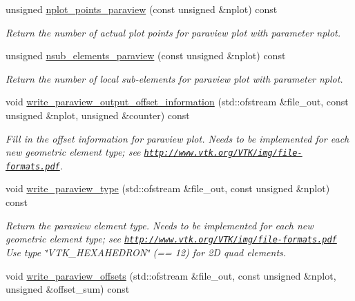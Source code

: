 \begin{DoxyCompactItemize}
unsigned \hyperlink{classoomph_1_1QElement_3_013_00_01NNODE__1D_01_4_a53c3d7fccadcf9ccb31ffb189204b969}{nplot\+\_\+points\+\_\+paraview} (const unsigned \&nplot) const
\begin{DoxyCompactList}\small\item\em Return the number of actual plot points for paraview plot with parameter nplot. \end{DoxyCompactList}\item 
unsigned \hyperlink{classoomph_1_1QElement_3_013_00_01NNODE__1D_01_4_ae10dea50eb35b969ebd996d21aa34c6b}{nsub\+\_\+elements\+\_\+paraview} (const unsigned \&nplot) const
\begin{DoxyCompactList}\small\item\em Return the number of local sub-\/elements for paraview plot with parameter nplot. \end{DoxyCompactList}\item 
void \hyperlink{classoomph_1_1QElement_3_013_00_01NNODE__1D_01_4_af7668b4257246d397fc5302bed22c5b5}{write\+\_\+paraview\+\_\+output\+\_\+offset\+\_\+information} (std\+::ofstream \&file\+\_\+out, const unsigned \&nplot, unsigned \&counter) const
\begin{DoxyCompactList}\small\item\em Fill in the offset information for paraview plot. Needs to be implemented for each new geometric element type; see \href{http://www.vtk.org/VTK/img/file-formats.pdf}{\tt http\+://www.\+vtk.\+org/\+V\+T\+K/img/file-\/formats.\+pdf}. \end{DoxyCompactList}\item 
void \hyperlink{classoomph_1_1QElement_3_013_00_01NNODE__1D_01_4_ad7a02e0ff26ec1a2e757c54ba993cfb7}{write\+\_\+paraview\+\_\+type} (std\+::ofstream \&file\+\_\+out, const unsigned \&nplot) const
\begin{DoxyCompactList}\small\item\em Return the paraview element type. Needs to be implemented for each new geometric element type; see \href{http://www.vtk.org/VTK/img/file-formats.pdf}{\tt http\+://www.\+vtk.\+org/\+V\+T\+K/img/file-\/formats.\+pdf} Use type \char`\"{}\+V\+T\+K\+\_\+\+H\+E\+X\+A\+H\+E\+D\+R\+O\+N\char`\"{} (== 12) for 2D quad elements. \end{DoxyCompactList}\item 
void \hyperlink{classoomph_1_1QElement_3_013_00_01NNODE__1D_01_4_aae40e76c4c9e027ca636ff4feae577fc}{write\+\_\+paraview\+\_\+offsets} (std\+::ofstream \&file\+\_\+out, const unsigned \&nplot, unsigned \&offset\+\_\+sum) const

\end{DoxyCompactItemize}
